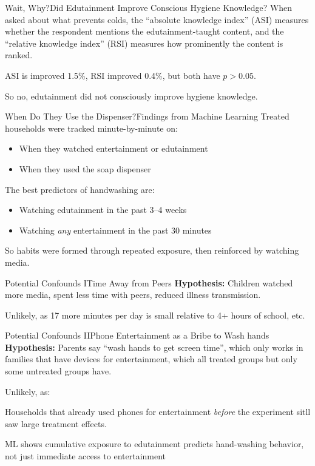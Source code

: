 \documentclass[aspectratio=169]{beamer}
\begin{document}
\begin{frame}{Wait, Why?}{Did Edutainment Improve Conscious Hygiene Knowledge?}
	When asked about what prevents colds, the ``absolute knowledge index''
	(ASI) measures whether the respondent mentions the edutainment-taught
	content, and the ``relative knowledge index'' (RSI) measures how
	prominently the content is ranked.

	ASI is improved 1.5\%, RSI improved 0.4\%, but both have $p > 0.05$.

	So no, edutainment did not consciously improve hygiene knowledge.
\end{frame}

\begin{frame}{When Do They Use the Dispenser?}{Findings from Machine Learning}
	Treated households were tracked minute-by-minute on:
	\begin{itemize}
		\item When they watched entertainment or edutainment
		\item When they used the soap dispenser
	\end{itemize}

	The best predictors of handwashing are:
	\begin{itemize}
		\item Watching edutainment in the past 3--4 weeks
		\item Watching \emph{any} entertainment in the past 30 minutes
	\end{itemize}

	So habits were formed through repeated exposure, then reinforced by watching media.
\end{frame}


\begin{frame}{Potential Confounds I}{Time Away from Peers}
	\textbf{Hypothesis:} Children watched more media, spent less time with peers, reduced illness transmission.

	Unlikely, as 17 more minutes per day is small relative to 4+ hours of school, etc.
\end{frame}

\begin{frame}{Potential Confounds II}{Phone Entertainment as a Bribe to Wash hands}
	\textbf{Hypothesis:} Parents say ``wash hands to get screen time'', which only works in families that have devices for entertainment, which all treated groups but only some untreated groups have.

	Unlikely, as:

	Households that already used phones for entertainment \emph{before} the
	experiment sitll saw large treatment effects.

	ML shows cumulative exposure to edutainment predicts hand-washing
	behavior, not just immediate access to entertainment
\end{frame}
\end{document}
